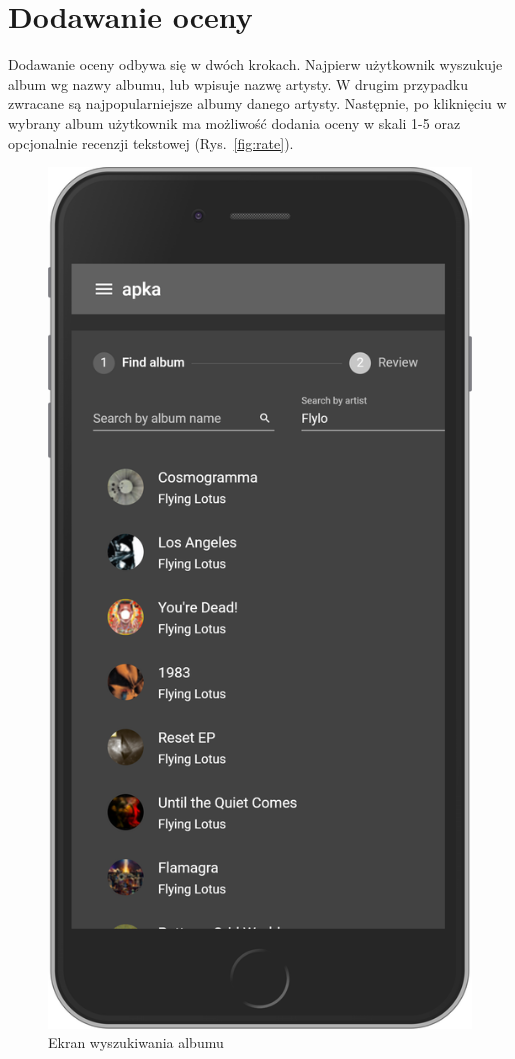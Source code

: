 \section{Dodawanie oceny}
	Dodawanie oceny odbywa się w dwóch krokach.
	Najpierw użytkownik wyszukuje album wg nazwy albumu, lub wpisuje nazwę artysty.
	W drugim przypadku zwracane są najpopularniejsze albumy danego artysty.
	Następnie, po kliknięciu w wybrany album użytkownik ma możliwość dodania oceny w skali 1-5 oraz opcjonalnie recenzji tekstowej (Rys.~\ref{fig:rate}).
	\begin{figure}[H]
		\centering
		\begin{minipage}{.5\textwidth}
			\centering
			\includegraphics[width=0.75\linewidth]{rys06/search.png}
			\caption{Ekran wyszukiwania albumu}

\end{minipage}
\end{figure}
